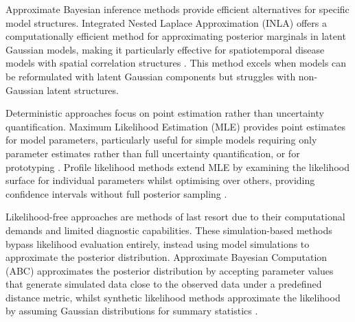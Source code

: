 \documentclass{article}
\begin{document}
Approximate Bayesian inference methods provide efficient alternatives for specific model structures.
Integrated Nested Laplace Approximation (INLA) offers a computationally efficient method for approximating posterior marginals in latent Gaussian models, making it particularly effective for spatiotemporal disease models with spatial correlation structures \citep{rue2017bayesian}.
This method excels when models can be reformulated with latent Gaussian components but struggles with non-Gaussian latent structures.

Deterministic approaches focus on point estimation rather than uncertainty quantification.
Maximum Likelihood Estimation (MLE) provides point estimates for model parameters, particularly useful for simple models requiring only parameter estimates rather than full uncertainty quantification, or for prototyping \citep{myung2003tutorial, baltazar2024maximum}.
Profile likelihood methods extend MLE by examining the likelihood surface for individual parameters whilst optimising over others, providing confidence intervals without full posterior sampling \citep{tonsing2018profile, plank2024structured}.

Likelihood-free approaches are methods of last resort due to their computational demands and limited diagnostic capabilities.
These simulation-based methods bypass likelihood evaluation entirely, instead using model simulations to approximate the posterior distribution.
Approximate Bayesian Computation (ABC) approximates the posterior distribution by accepting parameter values that generate simulated data close to the observed data under a predefined distance metric, whilst synthetic likelihood methods approximate the likelihood by assuming Gaussian distributions for summary statistics \citep{beaumont2002approximate, wood2010statistical, price2018bayesian}.
\end{document}
